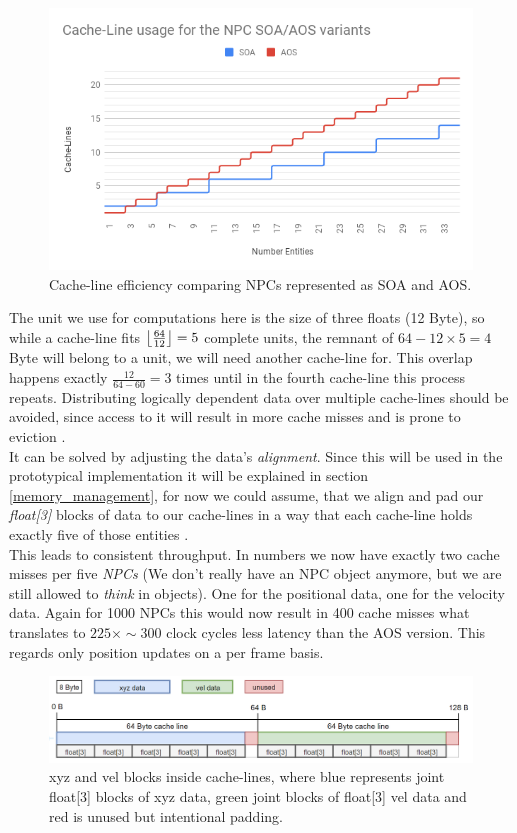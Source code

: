 \subsubsection{}
\vspace{-1cm}
\begin{figure}
	\centering
	\includegraphics[width=.6\textwidth, height=0.42\textwidth]{PICs/soa_aos_cl_usage}
	\caption{Cache-line efficiency comparing NPCs represented as SOA and AOS.}\label{soa_aos_cl_usage}
\end{figure}
The unit we use for computations here is the size of three floats (12 Byte), so while a cache-line fits $\left \lfloor \frac{64}{12} \right \rfloor=5$ complete units, the remnant of $64-12\times5 = 4$ Byte will belong to a unit, we will need another cache-line for. This overlap happens exactly $\frac{12}{64-60} = 3$ times until in the fourth cache-line this process repeats. Distributing logically dependent data over multiple cache-lines should be avoided, since access to it will result in more cache misses and is prone to eviction .\\
It can be solved by adjusting the data's \textit{alignment}. Since this will be used in the prototypical implementation it will be explained in section \ref{memory_management}, for now we could assume, that we align and pad our \textit{float[3]} blocks of data to our cache-lines in a way that each cache-line holds exactly five of those entities .\\
This leads to consistent throughput. In numbers we now have exactly two cache misses per five \textit{NPCs} (We don't really have an NPC object anymore, but we are still allowed to \textit{think} in objects). One for the positional data, one for the velocity data. Again for 1000 NPCs this would now result in 400 cache misses what translates to $225\times\sim300$ clock cycles less latency than the AOS version. This regards only position updates on a per frame basis.
\begin{figure}[!htbp]
	\centering
	\includegraphics[width=1.0\linewidth, height=0.17\linewidth]{PICs/CacheUtilizationNPCSOA}
	\caption{xyz and vel blocks inside cache-lines, where blue represents joint float[3] blocks of xyz data, green joint blocks of float[3] vel data and red is unused but intentional padding.}\label{cache_utilization_soa}
\end{figure}

